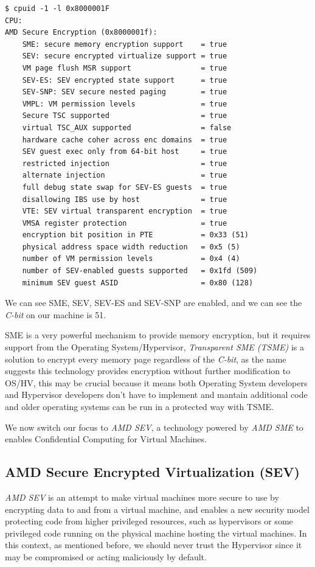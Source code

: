 \documentclass[twocolumn]{article}
\begin{document}
\begin{verbatim}
$ cpuid -1 -l 0x8000001F
CPU:
AMD Secure Encryption (0x8000001f):
    SME: secure memory encryption support    = true
    SEV: secure encrypted virtualize support = true
    VM page flush MSR support                = true
    SEV-ES: SEV encrypted state support      = true
    SEV-SNP: SEV secure nested paging        = true
    VMPL: VM permission levels               = true
    Secure TSC supported                     = true
    virtual TSC_AUX supported                = false
    hardware cache coher across enc domains  = true
    SEV guest exec only from 64-bit host     = true
    restricted injection                     = true
    alternate injection                      = true
    full debug state swap for SEV-ES guests  = true
    disallowing IBS use by host              = true
    VTE: SEV virtual transparent encryption  = true
    VMSA register protection                 = true
    encryption bit position in PTE           = 0x33 (51)
    physical address space width reduction   = 0x5 (5)    
    number of VM permission levels           = 0x4 (4)
    number of SEV-enabled guests supported   = 0x1fd (509)
    minimum SEV guest ASID                   = 0x80 (128)
\end{verbatim}

We can see SME, SEV, SEV-ES and SEV-SNP are enabled, and we can see the \textit{C-bit} on our machine is 51.

SME is a very powerful mechanism to provide memory encryption, but it requires support from the Operating System/Hypervisor, \textit{Transparent SME (TSME)} is a solution to encrypt every memory page regardless of the \textit{C-bit}, as the name suggests this technology provides encryption without further modification to OS/HV, this may be crucial because it means both Operating System developers and Hypervisor developers don't have to implement and mantain additional code and older operating systems can be run in a protected way with TSME.

We now switch our focus to \textit{AMD SEV}, a technology powered by \textit{AMD SME} to enables Confidential Computing for Virtual Machines.

\subsection{AMD Secure Encrypted Virtualization (SEV)}

\textit{AMD SEV} is an attempt to make virtual machines more secure to use by encrypting data to and from a virtual machine, and enables a new security model protecting code from higher privileged resources, such as hypervisors or some privileged code running on the physical machine hosting the virtual machines. In this context, as mentioned before, we should never trust the Hypervisor since it may be compromised or acting maliciously by default.
\end{document}

